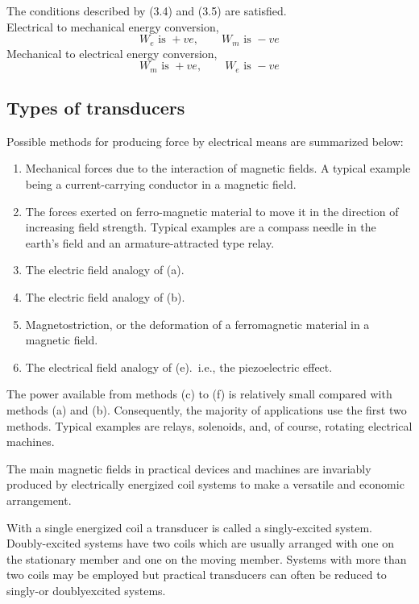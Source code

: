 \documentclass[a4paper,numbers=noenddot,12pt]{scrbook}
\begin{document}
            The conditions described by (3.4) and (3.5) are satisfied.\\ Electrical to mechanical energy conversion,
            \begin{equation*}
                W_e \text{\ is }+ve,\qquad W_m \text{\ is } -ve
            \end{equation*}
            Mechanical to electrical energy conversion,
            \begin{equation*}
                W_m \text{\ is }+ve,\qquad W_e \text{\ is } -ve
            \end{equation*}

            \subsection{Types of transducers}
            Possible methods for producing force by electrical means are summarized below:
            \begin{enumerate}
                \item Mechanical forces due to the interaction of magnetic fields. A typical example being a current-carrying conductor in a magnetic field.
                \item The forces exerted on ferro-magnetic material to move it in the direction of increasing field strength. Typical examples are a compass needle in the earth's field and an armature-attracted type relay.
                \item The electric field analogy of (a).
                \item The electric field analogy of (b).
                \item Magnetostriction, or the deformation of a ferromagnetic material in a magnetic field.
                \item The electrical field analogy of (e).\ i.e., the piezoelectric effect.
            \end{enumerate}

            The power available from methods (c) to (f) is relatively small compared with methods (a) and (b). Consequently, the majority of applications use the first two methods. Typical examples are relays, solenoids, and, of course, rotating electrical machines. 

            The main magnetic fields in practical devices and machines are invariably produced by electrically energized coil systems to make a versatile and economic arrangement. 

            With a single energized coil a transducer is called a singly-excited system. Doubly-excited systems have two coils which are usually arranged with one on the stationary member and one on the moving member. Systems with more than two coils may be employed but practical transducers can often be reduced to singly-or doubly­excited systems. 
\end{document}
